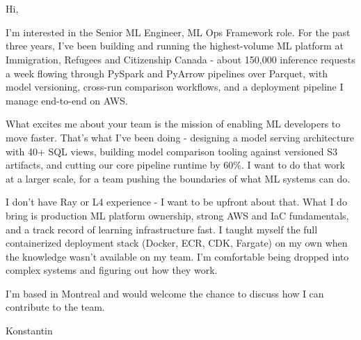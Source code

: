 \documentclass[letter,11pt]{article}
\begin{document}
\setlength{\parindent}{0pt}
\setlength{\parskip}{0.8em}

\section{}
\vspace{1.5em}

Hi,

I'm interested in the Senior ML Engineer, ML Ops Framework role. For the past three years, I've been building and running the highest-volume ML platform at Immigration, Refugees and Citizenship Canada - about 150,000 inference requests a week flowing through PySpark and PyArrow pipelines over Parquet, with model versioning, cross-run comparison workflows, and a deployment pipeline I manage end-to-end on AWS.

What excites me about your team is the mission of enabling ML developers to move faster. That's what I've been doing - designing a model serving architecture with 40+ SQL views, building model comparison tooling against versioned S3 artifacts, and cutting our core pipeline runtime by 60\%. I want to do that work at a larger scale, for a team pushing the boundaries of what ML systems can do.

I don't have Ray or L4 experience - I want to be upfront about that. What I do bring is production ML platform ownership, strong AWS and IaC fundamentals, and a track record of learning infrastructure fast. I taught myself the full containerized deployment stack (Docker, ECR, CDK, Fargate) on my own when the knowledge wasn't available on my team. I'm comfortable being dropped into complex systems and figuring out how they work.

I'm based in Montreal and would welcome the chance to discuss how I can contribute to the team.

\vspace{1.5em}
Konstantin
\end{document}

